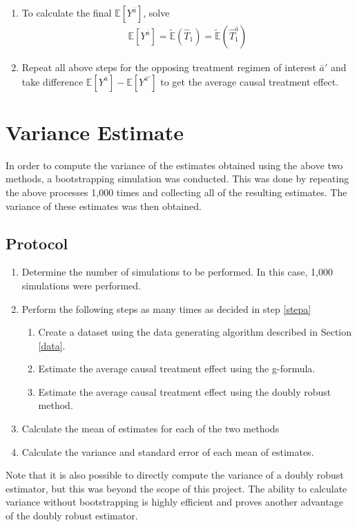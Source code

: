 \begin{enumerate}
\item To calculate the final $\mathbb{E}[Y^{\bar{a}}]$, solve 
\begin{align} 
\mathbb{E}[Y^{\bar{a}}] = \tilde{\mathbb{E}}(\hat{T}_1) = \tilde{\mathbb{E}}(\hat{T}_1^{\bar{a}})
\end{align}

\item Repeat all above steps for the opposing treatment regimen of interest $\bar{a}'$ and take difference $\mathbb{E}[Y^{\bar{a}}] - \mathbb{E}[Y^{\bar{a}'}]$ to get the average causal treatment effect.  
\end{enumerate}

\section{Variance Estimate} \label{VarianceBootStrap}
In order to compute the variance of the estimates obtained using the above two methods, a bootstrapping simulation was conducted.  This was done by repeating the above processes 1,000 times and collecting all of the resulting estimates.  The variance of these estimates was then obtained.  

\subsection{Protocol}
\begin{enumerate} 
\item Determine the number of simulations to be performed.  In this case, 1,000 simulations were performed.  \label{stepa} 
\item Perform the following steps as many times as decided in step \ref{stepa} 
\begin{enumerate}
\item Create a dataset using the data generating algorithm described in Section \ref{data}.  
\item Estimate the average causal treatment effect using the g-formula.  
\item Estimate the average causal treatment effect using the doubly robust method.  
\end{enumerate} 
\item Calculate the mean of estimates for each of the two methods 
\item Calculate the variance and standard error of each mean of estimates.  
\end{enumerate} 

Note that it is also possible to directly compute the variance of a doubly robust estimator, but this was beyond the scope of this project.  The ability to calculate variance without bootstrapping is highly efficient and proves another advantage of the doubly robust estimator.  



